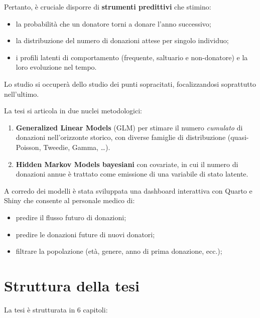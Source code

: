 \documentclass[
  italian,
  a4paper,
  a4paper,
  twoside,
  open=right,
  12pt]{scrbook}
\theoremstyle{definition}
\theoremstyle{remark}
\begin{document}
Pertanto, è cruciale disporre di \textbf{strumenti predittivi} che
stimino:

\begin{itemize}
\item
  la probabilità che un donatore torni a donare l'anno successivo;
\item
  la distribuzione del numero di donazioni attese per singolo individuo;
\item
  i profili latenti di comportamento (frequente, saltuario e
  non-donatore) e la loro evoluzione nel tempo.
\end{itemize}

Lo studio si occuperà dello studio dei punti sopracitati, focalizzandosi
soprattutto nell'ultimo.

La tesi si articola in due nuclei metodologici:

\begin{enumerate}
\def\labelenumi{\arabic{enumi}.}
\item
  \textbf{Generalized Linear Models} (GLM) per stimare il numero
  \emph{cumulato} di donazioni nell'orizzonte storico, con diverse
  famiglie di distribuzione (quasi-Poisson, Tweedie, Gamma, \ldots).
\item
  \textbf{Hidden Markov Models bayesiani} con covariate, in cui il
  numero di donazioni annue è trattato come emissione di una variabile
  di stato latente.
\end{enumerate}

A corredo dei modelli è stata sviluppata una dashboard interattiva con
Quarto e Shiny che consente al personale medico di:

\begin{itemize}
\item
  predire il flusso futuro di donazioni;
\item
  predire le donazioni future di nuovi donatori;
\item
  filtrare la popolazione (età, genere, anno di prima donazione, ecc.);
\end{itemize}

\section{Struttura della tesi}\label{struttura-della-tesi}

La tesi è strutturata in 6 capitoli:
\end{document}

